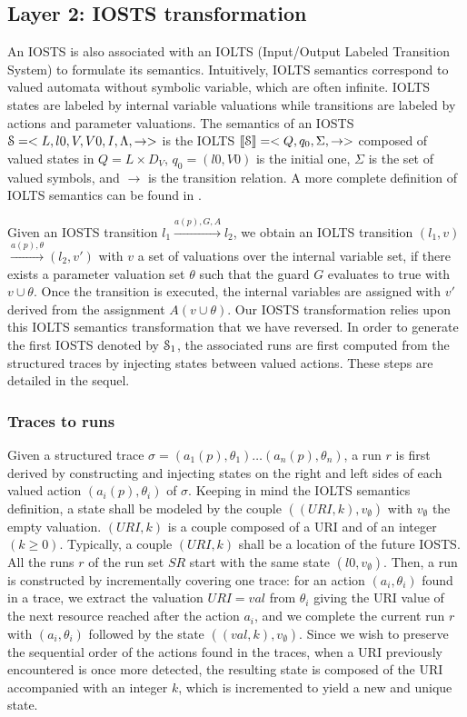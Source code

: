 \subsection{Layer 2: IOSTS transformation}
\label{sec:modelinf:webapps:L2}

An IOSTS is also associated with an IOLTS (Input/Output Labeled
Transition System) to formulate its semantics. Intuitively, IOLTS
semantics correspond to valued automata without symbolic
variable, which are often infinite. IOLTS states are labeled by
internal variable valuations while transitions are labeled by
actions and parameter valuations. The semantics of an IOSTS
$\EuScript{S}=<L,l0,V,V0,I,\Lambda,\rightarrow>$ is the IOLTS
$\llbracket \EuScript{S}\rrbracket = <Q,q_0,\Sigma,\rightarrow>$
composed of valued states in $Q = L \times D_V$, $q_0=(l0,V0)$
is the initial one, $\Sigma$ is the set of valued symbols, and
$\rightarrow$ is the transition relation. A more complete
definition of IOLTS semantics can be found in \cite{FTW05}.

Given an IOSTS transition $l_1 \xrightarrow{a(p),G,A}l_2$, we
obtain an IOLTS transition $(l_1,v)$ $\xrightarrow{a(p),\theta}
(l_2,v')$ with $v$ a set of valuations over the internal variable
set, if there exists a parameter valuation set $\theta$ such that
the guard $G$ evaluates to true with $v \cup \theta$. Once the
transition is executed, the internal variables are assigned with
$v'$ derived from the assignment $A(v \cup \theta)$.
Our IOSTS transformation relies upon this IOLTS semantics
transformation that we have reversed.  In order to generate the
first IOSTS denoted by $\EuScript{S}_1$, the associated runs are
first computed from the structured traces by injecting states
between valued actions. These steps are detailed in the
sequel.

\subsubsection{Traces to runs}

Given a structured trace $\sigma = (a_1(p),\theta_1) \dots
(a_n(p),\theta_n)$, a run $r$ is first derived by constructing
and injecting states on the right and left sides of
each valued action $(a_i(p),\theta_i)$ of $\sigma$. Keeping in
mind the IOLTS semantics definition, a state shall be modeled by
the couple $((URI,k),v_\emptyset)$ with $v_\emptyset$ the empty
valuation.  $(URI,k)$ is a couple composed of a URI and of an
integer $(k \geq 0)$. Typically, a couple $(URI,k)$ shall be a
location of the future IOSTS. All the runs $r$ of the run set
$SR$ start with the same state $(l0,v_\emptyset)$. Then, a run is
constructed by incrementally covering one trace: for an action
$(a_i,\theta_i)$ found in a trace, we extract the valuation
$URI=val$ from $\theta_i$ giving the URI value of the next
resource reached after the action $a_i$, and we complete the
current run $r$ with $(a_i,\theta_i)$ followed by the state
$((val,k),v_\emptyset)$.  Since we wish to preserve the
sequential order of the actions found in the traces, when a URI
previously encountered is once more detected, the resulting state
is composed of the URI accompanied with an integer $k$, which is
incremented to yield a new and unique state.

